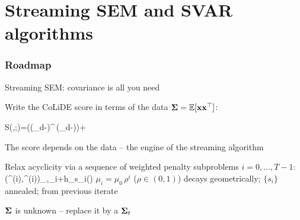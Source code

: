 \documentclass[9pt, aspectratio=169, xcolor=table]{beamer}
\newcommand{\EE}{{\mathbb E}}
\DeclareMathOperator{\Tr}{Trace}
\begin{document}
\section{Streaming SEM and SVAR algorithms}
\begin{frame} \frametitle{Roadmap} \tableofcontents[currentsection] \end{frame}


\begin{frame}{Streaming SEM: covariance is all you need}\svpos

	\bi Write the CoLiDE score in terms of the data  $\bbSigma=\EE[\bbx\bbx^\top]$:
	\begin{myblock}
		\be S(\bbW,\sigma;\bbSigma)=\Tr\!\big((\bbI_d-\bbW)^\top\blue{\bbSigma}\,(\bbI_d-\bbW)\big)+ \ee
	\end{myblock}
	\ai The score depends on the data  -- the engine of the streaming algorithm\ei \svpos

	\bi Relax acyclicity via a sequence of weighted penalty subproblems $i=0,\ldots,T-1$:
	\be (\widehat{\bbW}^{(i)},\widehat{\sigma}^{(i)})\in\arg\min_{\bbW,\sigma}\;\mu_i+h_{s_i}(\bbW) \ee
	\ai $\mu_i=\mu_0\,\rho^i$ ($\rho\in(0,1)$) decays geometrically; $\{s_i\}$ annealed;  from previous iterate\ei \svpos

	\pause

	\bi {} $\boldsymbol{\Sigma}$ is unknown -- replace it by a  $\boldsymbol{\Sigma}_t$\ei

\end{frame}

\end{document}
